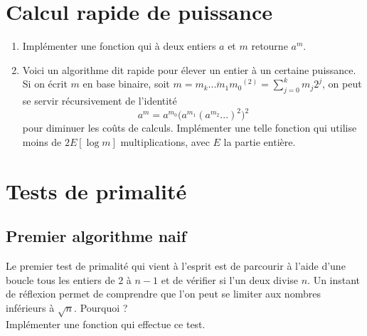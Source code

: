 
\section{Calcul rapide de puissance}

\begin{enumerate}
\item Implémenter une fonction qui à deux entiers $a$ et $m$ retourne $a^m$.
\item Voici un algorithme dit rapide pour élever un entier à un certaine puissance. Si on écrit $m$ en base binaire, soit $m=\overline{m_k ... m_1 m_0}^{(2)} = \sum_{j=0}^k m_j 2^j$, on peut se servir récursivement de l'identité
\[a^m = a^{m_0 }\big(a^{m_1}(a^{m_2}...)^2\big)^2\]
pour diminuer les coûts de calculs. Implémenter une telle fonction qui utilise moins de $2 E[\log m]$ multiplications, avec $E$ la partie entière.
\end{enumerate}

\section{Tests de primalité}

\subsection{Premier algorithme naif} 
Le premier test de primalité qui vient à l'esprit est de parcourir à l'aide d'une boucle tous les entiers de $2$ à $n-1$ et de vérifier si l'un deux divise $n$. Un instant de réflexion permet de comprendre que l'on peut se limiter aux nombres inférieurs à $\sqrt n$. Pourquoi ?\\ 
Implémenter une fonction qui effectue ce test.

